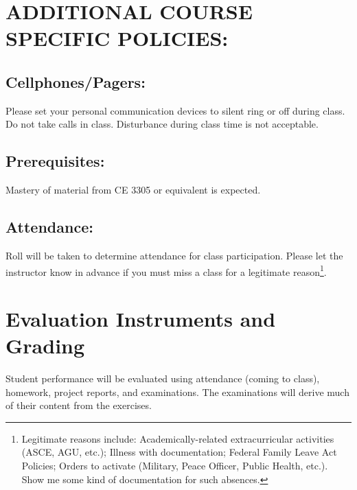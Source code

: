 \documentclass[12pt]{article}
\begin{document}
\section*{ADDITIONAL COURSE SPECIFIC POLICIES:}
\subsection*{Cellphones/Pagers: }
Please set your personal communication devices to silent ring or off during class. Do not take calls in class. Disturbance during class time is not acceptable.
\subsection*{Prerequisites:} 
Mastery of material from CE 3305 or equivalent is expected.
\subsection*{Attendance:} Roll will be taken to determine attendance for class participation.  Please let the instructor know in advance if you must miss a class for a legitimate reason\footnote{Legitimate reasons include: Academically-related extracurricular activities (ASCE, AGU, etc.); Illness with documentation; Federal Family Leave Act Policies; Orders to activate (Military, Peace Officer, Public Health, etc.).  Show me some kind of documentation for such absences.}. 

\section*{Evaluation Instruments and Grading}
Student performance will be evaluated using attendance (coming to class), homework, project reports, and examinations.   The examinations will derive much of their content from the exercises.  %

\end{document}
